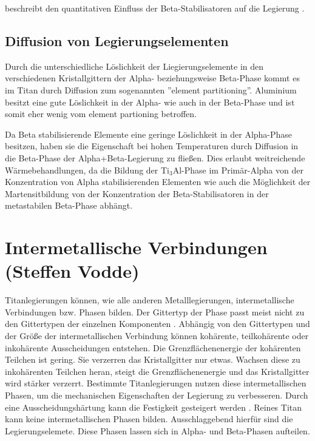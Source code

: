 \documentclass[a4paper, 11pt]{tubsreprt}
\begin{document}
beschreibt den quantitativen Einfluss der Beta-Stabilisatoren auf die Legierung \cite{Luetjering2007}.

\subsection{Diffusion von Legierungselementen}\label{Kapitel Diffusion von legierungselementen}
Durch die unterschiedliche Löslichkeit der Liegierungselemente in den verschiedenen Kristallgittern der Alpha- beziehungsweise Beta-Phase kommt es im Titan durch Diffusion zum sogenannten ''element partitioning''. Aluminium besitzt eine gute Löslichkeit in der Alpha- wie auch in der Beta-Phase und ist somit eher wenig vom element partioning betroffen.

Da Beta stabilisierende Elemente eine geringe Löslichkeit in der Alpha-Phase besitzen, haben sie die Eigenschaft bei hohen Temperaturen durch Diffusion in die Beta-Phase der Alpha+Beta-Legierung zu fließen. Dies erlaubt weitreichende Wärmebehandlungen, da die Bildung der Ti$_{3}$Al-Phase im Primär-Alpha von der Konzentration von Alpha stabilisierenden Elementen wie auch die Möglichkeit der Martensitbildung von der Konzentration der Beta-Stabilisatoren in der metastabilen Beta-Phase abhängt.
\newpage

\section{Intermetallische Verbindungen (Steffen Vodde)}
Titanlegierungen können, wie alle anderen Metalllegierungen, intermetallische Verbindungen bzw. Phasen bilden. Der Gittertyp der Phase passt meist nicht zu den Gittertypen der einzelnen Komponenten \cite[vgl.]{Domke1986}. Abhängig von den Gittertypen und der Größe der intermetallischen Verbindung können kohärente, teilkohärente oder inkohärente Ausscheidungen entstehen. Die Grenzflächenenergie der kohärenten Teilchen ist gering. Sie verzerren das Kristallgitter nur etwas. Wachsen diese zu inkohärenten Teilchen heran, steigt die Grenzflächenenergie und das Kristallgitter wird stärker verzerrt. 
Bestimmte Titanlegierungen nutzen diese intermetallischen Phasen, um die mechanischen Eigenschaften der Legierung zu verbesseren. Durch eine Ausscheidungshärtung kann die Festigkeit gesteigert werden \cite{Luetjering2007}. Reines Titan kann keine intermetallischen Phasen bilden. Ausschlaggebend hierfür sind die Legierungselemete. Diese Phasen lassen sich in Alpha- und Beta-Phasen aufteilen.  
 
\end{document}
